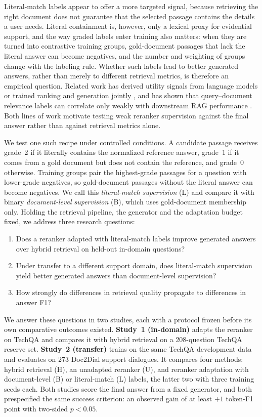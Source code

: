 Literal-match labels appear to offer a more targeted signal, because retrieving the right document does not guarantee that the selected passage contains the details a user needs. Literal containment is, however, only a lexical proxy for evidential support, and the way graded labels enter training also matters: when they are turned into contrastive training groups, gold-document passages that lack the literal answer can become negatives, and the number and weighting of groups change with the labeling rule. Whether such labels lead to better generated answers, rather than merely to different retrieval metrics, is therefore an empirical question. Related work has derived utility signals from language models or trained ranking and generation jointly \citep{shi2024,yu2024,zhang2025utility}, and has shown that query--document relevance labels can correlate only weakly with downstream RAG performance \citep{salemi2024}. Both lines of work motivate testing weak reranker supervision against the final answer rather than against retrieval metrics alone.

We test one such recipe under controlled conditions. A candidate passage receives grade~2 if it literally contains the normalized reference answer, grade~1 if it comes from a gold document but does not contain the reference, and grade~0 otherwise. Training groups pair the highest-grade passages for a question with lower-grade negatives, so gold-document passages without the literal answer can become negatives. We call this \emph{literal-match supervision} (L) and compare it with binary \emph{document-level supervision} (B), which uses gold-document membership only. Holding the retrieval pipeline, the generator and the adaptation budget fixed, we address three research questions:
\begin{enumerate}[label=\textbf{RQ\arabic*},leftmargin=3em]
\item Does a reranker adapted with literal-match labels improve generated answers over hybrid retrieval on held-out in-domain questions?
\item Under transfer to a different support domain, does literal-match supervision yield better generated answers than document-level supervision?
\item How strongly do differences in retrieval quality propagate to differences in answer F1?
\end{enumerate}

We answer these questions in two studies, each with a protocol frozen before its own comparative outcomes existed. \textbf{Study~1 (in-domain)} adapts the reranker on TechQA and compares it with hybrid retrieval on a 208-question TechQA reserve set. \textbf{Study~2 (transfer)} trains on the same TechQA development data and evaluates on 273 Doc2Dial support dialogues. It compares four methods: hybrid retrieval (H), an unadapted reranker (U), and reranker adaptation with document-level (B) or literal-match (L) labels, the latter two with three training seeds each. Both studies score the final answer from a fixed generator, and both prespecified the same success criterion: an observed gain of at least $+1$ token-F1 point with two-sided $p<0.05$.

